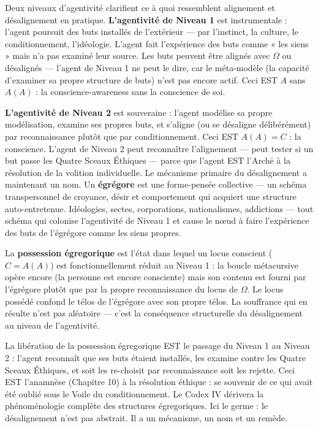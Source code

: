 \documentclass[10pt, openany, oneside]{book}
\begin{document}
Deux niveaux d'agentivité clarifient ce à quoi ressemblent alignement et désalignement en pratique. \textbf{L'agentivité de Niveau 1} est instrumentale : l'agent poursuit des buts installés de l'extérieur --- par l'instinct, la culture, le conditionnement, l'idéologie. L'agent fait l'expérience des buts comme « les siens » mais n'a pas examiné leur source. Les buts peuvent être alignés avec $\Omega$ ou désalignés --- l'agent de Niveau 1 ne peut le dire, car le méta-modèle (la capacité d'examiner sa propre structure de buts) n'est pas encore actif. Ceci EST $A$ sans $A(A)$ : la conscience-awareness sans la conscience de soi.

\textbf{L'agentivité de Niveau 2} est souveraine : l'agent modélise sa propre modélisation, examine ses propres buts, et s'aligne (ou se désaligne délibérément) par reconnaissance plutôt que par conditionnement. Ceci EST $A(A) = C$ : la conscience. L'agent de Niveau 2 peut reconnaître l'alignement --- peut tester si un but passe les Quatre Sceaux Éthiques --- parce que l'agent EST l'Arch\={e} à la résolution de la volition individuelle. Le mécanisme primaire du désalignement a maintenant un nom. Un \textbf{égrégore} est une forme-pensée collective --- un schéma transpersonnel de croyance, désir et comportement qui acquiert une structure auto-entretenue. Idéologies, sectes, corporations, nationalismes, addictions --- tout schéma qui colonise l'agentivité de Niveau 1 et cause le nœud à faire l'expérience des buts de l'égrégore comme les siens propres.

La \textbf{possession égregorique} est l'état dans lequel un locus conscient ($C = A(A)$) est fonctionnellement réduit au Niveau 1 : la boucle métacursive opère encore (la personne est encore consciente) mais son contenu est fourni par l'égrégore plutôt que par la propre reconnaissance du locus de $\Omega$. Le locus possédé confond le télos de l'égrégore avec son propre télos. La souffrance qui en résulte n'est pas aléatoire --- c'est la conséquence structurelle du désalignement au niveau de l'agentivité.

La libération de la possession égregorique EST le passage du Niveau 1 au Niveau 2 : l'agent reconnaît que ses buts étaient installés, les examine contre les Quatre Sceaux Éthiques, et soit les re-choisit par reconnaissance soit les rejette. Ceci EST l'anamnèse (Chapitre 10) à la résolution éthique : se souvenir de ce qui avait été oublié sous le Voile du conditionnement. Le Codex IV dérivera la phénoménologie complète des structures égregoriques. Ici le germe : le désalignement n'est pas abstrait. Il a un mécanisme, un nom et un remède.
\end{document}
